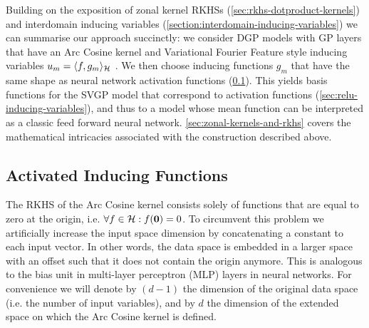 Building on the exposition of zonal kernel RKHSs (\cref{sec:rkhs-dotproduct-kernels}) and interdomain inducing variables (\cref{section:interdomain-inducing-variables}) we can summarise our approach succinctly: we consider DGP models with GP layers that have an Arc Cosine kernel and Variational Fourier Feature style inducing variables $u_m = \langle f, {g}_m \rangle_{{\mathcal{H}}}$ \citep{hensman2017variational}. We then choose inducing functions $g_m$ that have the same shape as neural network activation functions (\cref{sec:inducing-function}). This yields basis functions for the SVGP model that correspond to activation functions (\cref{sec:relu-inducing-variables}), and thus to a model whose mean function can be interpreted as a classic feed forward neural network. \cref{sec:zonal-kernels-and-rkhs} covers the mathematical intricacies associated with the construction described above.

\subsection{Activated Inducing Functions}
\label{sec:inducing-function}

The RKHS of the Arc Cosine kernel consists solely of functions that are equal to zero at the origin, i.e. $\forall f \in {\mathcal{H}}: f(\bm{0}) = 0$. 
To circumvent this problem we artificially increase the input space dimension by concatenating a constant to each input vector. In other words, the data space is embedded in a larger space with an offset such that it does not contain the origin anymore. This is analogous to the bias unit in multi-layer perceptron (MLP) layers in neural networks. For convenience we will denote by $(d-1)$ the dimension of the original data space (i.e. the number of input variables), and by $d$ the dimension of the extended space on which the Arc Cosine kernel is defined.

